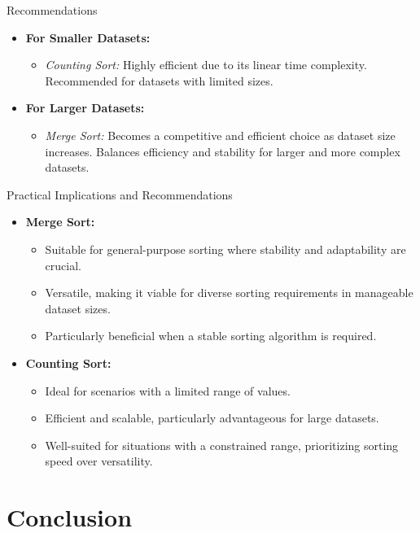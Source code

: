 \documentclass{beamer}
\begin{document}
\begin{frame}{Recommendations}
	\begin{itemize}
		\item \textbf{For Smaller Datasets:}
		\begin{itemize}
			\item \textit{Counting Sort:} Highly efficient due to its linear time complexity. Recommended for datasets with limited sizes.
		\end{itemize}
		\item \textbf{For Larger Datasets:}
		\begin{itemize}
			\item \textit{Merge Sort:} Becomes a competitive and efficient choice as dataset size increases. Balances efficiency and stability for larger and more complex datasets.
		\end{itemize}
	\end{itemize}
\end{frame}

\begin{frame}{Practical Implications and Recommendations}
		\begin{itemize}
			\item \textbf{Merge Sort:}
			\begin{itemize}
				\item Suitable for general-purpose sorting where stability and adaptability are crucial.
				\item Versatile, making it viable for diverse sorting requirements in manageable dataset sizes.
				\item Particularly beneficial when a stable sorting algorithm is required.
			\end{itemize}
			
			\item \textbf{Counting Sort:}
			\begin{itemize}
				\item Ideal for scenarios with a limited range of values.
				\item Efficient and scalable, particularly advantageous for large datasets.
				\item Well-suited for situations with a constrained range, prioritizing sorting speed over versatility.
			\end{itemize}
		\end{itemize}

\end{frame}


	\section{Conclusion}
	
\end{document}
